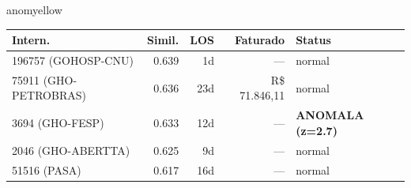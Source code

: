 \documentclass[a4paper,10pt]{article}
\begin{document}
\begin{anomalycard}[Internacao 11089 | GHO-POSTAL | MODERADO (z=2.94)]{anomyellow}
\begin{tabular}{l r r r l}\toprule\textbf{Intern.} & \textbf{Simil.} & \textbf{LOS} & \textbf{Faturado} & \textbf{Status} \\\midrule
196757 (GOHOSP-CNU) & 0.639 & 1d & --- & \textcolor{jcubeblue}{normal} \\
75911 (GHO-PETROBRAS) & 0.636 & 23d & R\$ 71.846,11 & \textcolor{jcubeblue}{normal} \\
3694 (GHO-FESP) & 0.633 & 12d & --- & \textcolor{anomred}{\textbf{ANOMALA (z=2.7)}} \\
2046 (GHO-ABERTTA) & 0.625 & 9d & --- & \textcolor{jcubeblue}{normal} \\
51516 (PASA) & 0.617 & 16d & --- & \textcolor{jcubeblue}{normal} \\
\bottomrule\end{tabular}


\end{anomalycard}

\newpage
\end{document}
